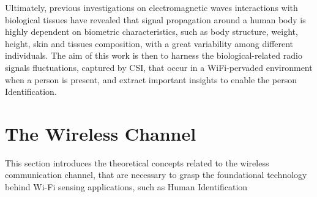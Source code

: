 \documentclass[binding=0.7cm, oneside]{sapthesis}
\begin{document}
Ultimately, previous investigations on electromagnetic waves interactions with biological tissues \cite{tissues_waves_interaction} have revealed that signal propagation around a human body is
highly dependent on biometric characteristics, such as body structure, weight, height, skin and tissues composition, with a great variability among different individuals.
The aim of this work is then to harness the biological-related radio signals fluctuations, captured by CSI, that occur in a WiFi-pervaded environment when a person is present, and extract
important insights to enable the person Identification.

\chapter{The Wireless Channel}
This section introduces the theoretical concepts related to the wireless communication channel, that are necessary to grasp the foundational technology behind Wi-Fi sensing applications, such as Human Identification
\end{document}
